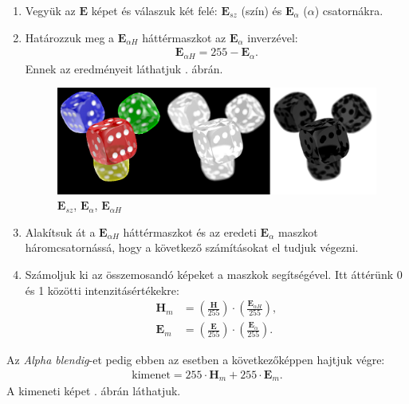 \begin{enumerate}
	\item Vegyük az $\boldsymbol E$ képet és válaszuk két felé: $\boldsymbol E_{sz}$ (szín) és $\boldsymbol E_\alpha$ ($\alpha$) csatornákra.
	\item Határozzuk meg a $\boldsymbol E_{\alpha H}$ háttérmaszkot az $\boldsymbol E_\alpha$ inverzével:
		\begin{align*}
			\boldsymbol E_{\alpha H} = 255 - \boldsymbol E_\alpha.
		\end{align*}
Ennek az eredményeit láthatjuk . ábrán.

		\begin{figure}[h]
			\centering
			\includegraphics[width=10.24truecm, height=3.41truecm]{images/blending_02.png}
			\caption{$\boldsymbol E_{sz}$, $\boldsymbol E_\alpha$, $\boldsymbol E_{\alpha H}$}
			\label{fig:blend02}
		\end{figure}	
	\item Alakítsuk át a $\boldsymbol E_{\alpha H}$ háttérmaszkot és az eredeti $\boldsymbol E_\alpha$ maszkot háromcsatornássá, hogy a következő számításokat el tudjuk végezni.
	\item Számoljuk ki az összemosandó képeket a maszkok segítségével. Itt áttérünk 0 és 1 közötti intenzitásértékekre:
		\begin{align*}
				\boldsymbol H_m &= \left(\frac{\boldsymbol H}{255}\right) \cdot \left(\frac{\boldsymbol E_{\alpha H}}{255}\right),\\
				\boldsymbol E_m &= \left(\frac{\boldsymbol E}{255}\right) \cdot \left(\frac{\boldsymbol E_\alpha}{255}\right).
		\end{align*}
\end{enumerate}
Az \textit{Alpha blendig}-et pedig ebben az esetben a következőképpen hajtjuk végre:
\begin{align*}
	\text{kimenet} = 255 \cdot \boldsymbol H_m + 255 \cdot \boldsymbol E_m.
\end{align*}
A kimeneti képet . ábrán láthatjuk.

